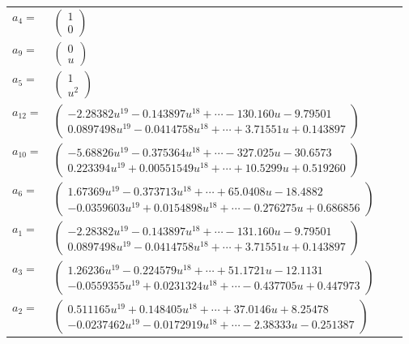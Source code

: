 \documentclass[1p]{elsarticle_modified}
\theoremstyle{definition}
\begin{document}
\begin{tabular}{m{7pt} m{180pt} m{7pt} m{180pt} }
\flushright $a_{4}=$&$\begin{pmatrix}1\\0\end{pmatrix}$ \\
\flushright $a_{9}=$&$\begin{pmatrix}0\\u\end{pmatrix}$ \\
\flushright $a_{5}=$&$\begin{pmatrix}1\\u^2\end{pmatrix}$ \\
\flushright $a_{12}=$&$\begin{pmatrix}-2.28382 u^{19}-0.143897 u^{18}+\cdots-130.160 u-9.79501\\0.0897498 u^{19}-0.0414758 u^{18}+\cdots+3.71551 u+0.143897\end{pmatrix}$ \\
\flushright $a_{10}=$&$\begin{pmatrix}-5.68826 u^{19}-0.375364 u^{18}+\cdots-327.025 u-30.6573\\0.223394 u^{19}+0.00551549 u^{18}+\cdots+10.5299 u+0.519260\end{pmatrix}$ \\
\flushright $a_{6}=$&$\begin{pmatrix}1.67369 u^{19}-0.373713 u^{18}+\cdots+65.0408 u-18.4882\\-0.0359603 u^{19}+0.0154898 u^{18}+\cdots-0.276275 u+0.686856\end{pmatrix}$ \\
\flushright $a_{1}=$&$\begin{pmatrix}-2.28382 u^{19}-0.143897 u^{18}+\cdots-131.160 u-9.79501\\0.0897498 u^{19}-0.0414758 u^{18}+\cdots+3.71551 u+0.143897\end{pmatrix}$ \\
\flushright $a_{3}=$&$\begin{pmatrix}1.26236 u^{19}-0.224579 u^{18}+\cdots+51.1721 u-12.1131\\-0.0559355 u^{19}+0.0231324 u^{18}+\cdots-0.437705 u+0.447973\end{pmatrix}$ \\
\flushright $a_{2}=$&$\begin{pmatrix}0.511165 u^{19}+0.148405 u^{18}+\cdots+37.0146 u+8.25478\\-0.0237462 u^{19}-0.0172919 u^{18}+\cdots-2.38333 u-0.251387\end{pmatrix}$ \\

\end{tabular}
\end{document}
